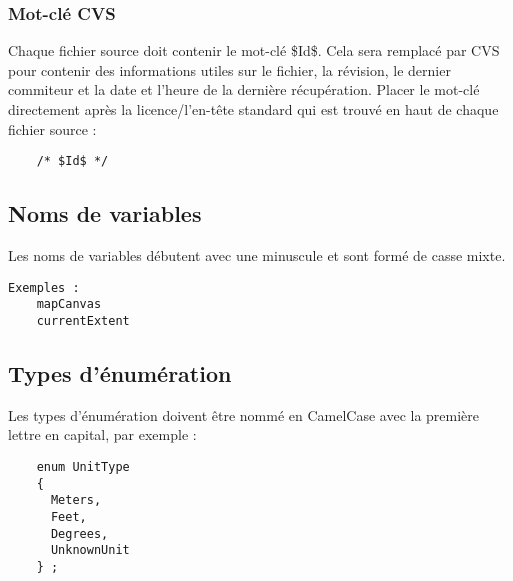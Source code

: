 \subsubsection{Mot-clé CVS}
Chaque fichier source doit contenir le mot-clé \$Id\$. Cela sera remplacé par CVS pour contenir des informations utiles sur le fichier, la révision, le dernier commiteur et la date et l'heure de la dernière récupération. 
Placer le mot-clé directement après la licence/l'en-tête standard qui est trouvé en haut de chaque fichier source :
\begin{verbatim}
	/* $Id$ */
\end{verbatim}

\subsection{Noms de variables}
Les noms de variables débutent avec une minuscule et sont formé de casse mixte.
\begin{verbatim}
Exemples :
	mapCanvas
	currentExtent
\end{verbatim}
\subsection{Types d'énumération}
Les types d'énumération doivent être nommé en CamelCase avec la première lettre en capital, par exemple :
\begin{verbatim}
    enum UnitType
    {
      Meters,
      Feet,
      Degrees,
      UnknownUnit
    } ;
\end{verbatim}

